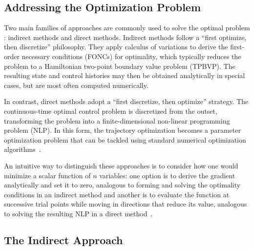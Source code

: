 
\subsection{Addressing the Optimization Problem}

Two main families of approaches are commonly used to solve the optimal problem \cite{Optimization_Review}: indirect methods and direct methods. Indirect methods follow a ``first optimize, then discretize'' philosophy. They apply calculus of variations to derive the first-order necessary conditions (FONCs) for optimality, which typically reduces the problem to a Hamiltonian two-point boundary value problem (TPBVP). The resulting state and control histories may then be obtained analytically in special cases, but are most often computed numerically.

In contrast, direct methods adopt a ``first discretize, then optimize'' strategy. The continuous-time optimal control problem is discretized from the outset, transforming the problem into a finite-dimensional non-linear programming problem (NLP). In this form, the trajectory optimization becomes a parameter optimization problem that can be tackled using standard numerical optimization algorithms~\cite{Optimization_Review}.

An intuitive way to distinguish these approaches is to consider how one would minimize a scalar function of $n$ variables: one option is to derive the gradient analytically and set it to zero, analogous to forming and solving the optimality conditions in an indirect method and another is to evaluate the function at successive trial points while moving in directions that reduce its value, analogous to solving the resulting NLP in a direct method~\cite{Optimization_Review}.


\subsection{The Indirect Approach}

